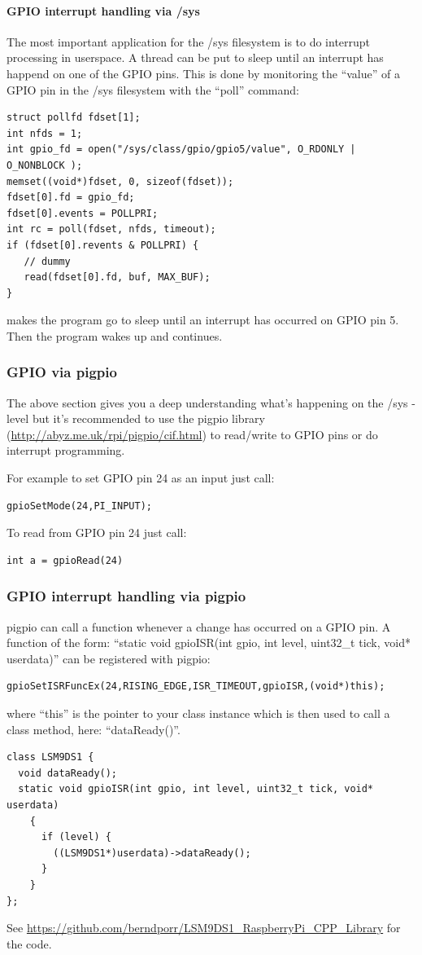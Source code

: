 \documentclass[12pt]{report}
\begin{document}
\paragraph{GPIO interrupt handling via /sys}
The most important application for the /sys filesystem is to
do interrupt processing in userspace.
A thread can be put to sleep until an interrupt has happend on one of
the GPIO pins. This is done by monitoring the ``value''
of a GPIO pin in the /sys filesystem with the ``poll'' command:
\begin{verbatim}
struct pollfd fdset[1];
int nfds = 1;
int gpio_fd = open("/sys/class/gpio/gpio5/value", O_RDONLY | O_NONBLOCK );
memset((void*)fdset, 0, sizeof(fdset));
fdset[0].fd = gpio_fd;
fdset[0].events = POLLPRI;
int rc = poll(fdset, nfds, timeout);
if (fdset[0].revents & POLLPRI) {
   // dummy
   read(fdset[0].fd, buf, MAX_BUF);
}
\end{verbatim}
makes the program go to sleep until an interrupt has occurred on
GPIO pin 5. Then the program wakes up and continues.

\subsubsection{GPIO via pigpio}
The above section gives you a deep understanding what's happening
on the /sys - level but it's recommended to
use the pigpio library (\url{http://abyz.me.uk/rpi/pigpio/cif.html})
to read/write to GPIO pins or do interrupt programming.

For example to set GPIO pin 24 as an input just call:
\begin{verbatim}
gpioSetMode(24,PI_INPUT);
\end{verbatim}

To read from GPIO pin 24 just call:
\begin{verbatim}
int a = gpioRead(24)
\end{verbatim}

\subsubsection{GPIO interrupt handling via pigpio}
pigpio can call a function whenever a change has occurred on a GPIO pin.
A function of the form:
``static void gpioISR(int gpio, int level, uint32\_t tick, void* userdata)''
can be registered with pigpio:
\begin{verbatim}
gpioSetISRFuncEx(24,RISING_EDGE,ISR_TIMEOUT,gpioISR,(void*)this);
\end{verbatim}
where ``this'' is the pointer to your class instance which is then used
to call a class method, here: ``dataReady()''.
\begin{verbatim}
class LSM9DS1 {
  void dataReady();
  static void gpioISR(int gpio, int level, uint32_t tick, void* userdata)
    {
      if (level) {
        ((LSM9DS1*)userdata)->dataReady();
      }
    }
};
\end{verbatim}
See \url{https://github.com/berndporr/LSM9DS1_RaspberryPi_CPP_Library} for the code.
\end{document}
